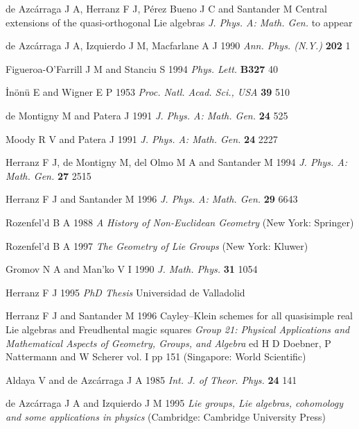 \begin{thebibliography}{30}

de Azc\'arraga J A,   Herranz F J,   P\'erez Bueno J C  and
Santander M  {Central extensions of the quasi-orthogonal Lie algebras}
{\em J. Phys. A: Math. Gen.} to appear

de Azc\'arraga J A, Izquierdo J M, Macfarlane A J 1990
{\em Ann. Phys. (N.Y.)} {\bf 202} 1

Figueroa-O'Farrill J M and Stanciu S 1994 {\em Phys. Lett.} {\bf B327} 40

\.In\"on\"u  E  and   Wigner E P 1953 {\em Proc. Natl.
Acad. Sci., USA}  {\bf 39}  510

   de Montigny M  and     Patera J 1991
{\em J. Phys. A: Math. Gen.} {\bf 24}   525

 Moody  R V  and    Patera J 1991
{\em J. Phys. A: Math. Gen.}  {\bf 24}  2227

  Herranz F J,   de Montigny M,   del Olmo M A   and   Santander M
1994 {\em J. Phys. A: Math. Gen.}  {\bf 27}  2515

  Herranz F J and   Santander M 1996
{\em J. Phys. A: Math. Gen.}  {\bf 29} 6643

    Rozenfel'd B A 1988
{\em A History of Non-Euclidean Geometry} (New York: Springer)

    Rozenfel'd B A 1997
{\em The Geometry of Lie Groups} (New York: Kluwer)

  Gromov N A and   Man'ko V I 1990 {\em J. Math. Phys.} {\bf 31}  1054

  Herranz F J 1995 {\em PhD Thesis}  Universidad de Valladolid

  Herranz F J and  Santander M 1996
{Cayley--Klein  schemes for all quasisimple real Lie algebras
  and Freudhental magic squares}
{\em Group  21: Physical Applications and Mathematical Aspects of Geometry,
Groups, and  Algebra} ed  H D  Doebner, P Nattermann  and W Scherer
  vol. I  pp 151  (Singapore: World Scientific)

 Aldaya V and   de Azc\'arraga J A 1985
{\em Int. J. of Theor. Phys.} {\bf 24}  141

  de Azc\'arraga J A and  Izquierdo J M 1995
{\em Lie groups, Lie algebras, cohomology and some applications in
  physics}   (Cambridge: Cambridge  University Press)

\end{thebibliography}
